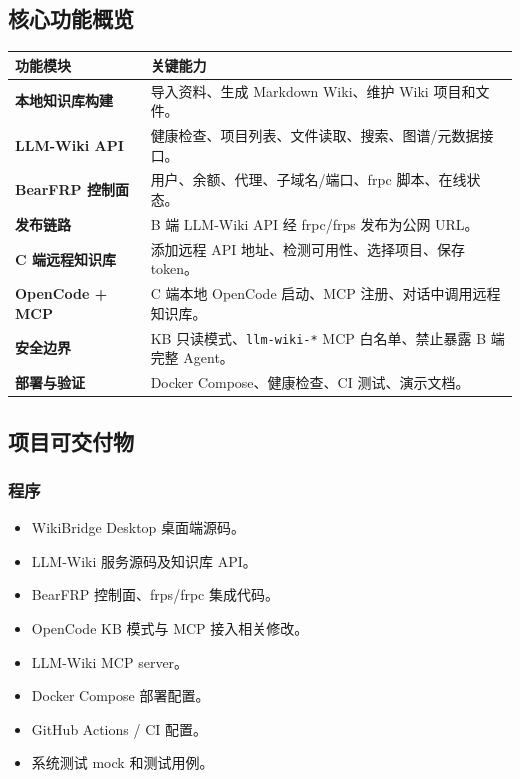 \documentclass[UTF8,a4paper,12pt,fontset=fandol]{ctexart}
\newcommand{\code}[1]{\begingroup\urlstyle{tt}\footnotesize\nolinkurl{#1}\endgroup}
\begin{document}
\subsection{核心功能概览}
\begin{longtable}{>{\bfseries}p{3.4cm}p{10.8cm}}
\toprule
功能模块 & 关键能力 \\
\midrule
本地知识库构建 & 导入资料、生成 Markdown Wiki、维护 Wiki 项目和文件。 \\
LLM-Wiki API & 健康检查、项目列表、文件读取、搜索、图谱/元数据接口。 \\
BearFRP 控制面 & 用户、余额、代理、子域名/端口、frpc 脚本、在线状态。 \\
发布链路 & B 端 LLM-Wiki API 经 frpc/frps 发布为公网 URL。 \\
C 端远程知识库 & 添加远程 API 地址、检测可用性、选择项目、保存 token。 \\
OpenCode + MCP & C 端本地 OpenCode 启动、MCP 注册、对话中调用远程知识库。 \\
安全边界 & KB 只读模式、\code{llm-wiki-*} MCP 白名单、禁止暴露 B 端完整 Agent。 \\
部署与验证 & Docker Compose、健康检查、CI 测试、演示文档。 \\
\bottomrule
\end{longtable}

\subsection{项目可交付物}
\subsubsection{程序}
\begin{itemize}
  \item WikiBridge Desktop 桌面端源码。
  \item LLM-Wiki 服务源码及知识库 API。
  \item BearFRP 控制面、frps/frpc 集成代码。
  \item OpenCode KB 模式与 MCP 接入相关修改。
  \item LLM-Wiki MCP server。
  \item Docker Compose 部署配置。
  \item GitHub Actions / CI 配置。
  \item 系统测试 mock 和测试用例。
\end{itemize}
\end{document}
